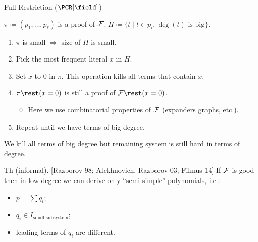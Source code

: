 \begin{frame}{Full Restriction ($\PCR[\field]$)}
    
    $\pi \coloneqq (p_1, \dots, p_{\ell})$ is a proof of $\mathcal{F}$. $H \coloneqq \{t \mid t \in p_i, \deg(t)
    \text{ is big}\}$.

    \begin{enumerate}
        \item $\pi$ is small $\Rightarrow$ size of $H$ is small.
        \pause
        \item Pick the most frequent literal $x$ in $H$.
        \pause
        \item Set $x$ to $0$ in $\pi$. This operation kills all terms that contain $x$.
        \pause
        \item $\pi \rest (x = 0)$ is still a proof of $\Fs \rest (x = 0)$.
        \pause
        \pause
        \pause
            \begin{itemize}
                \item Here we use combinatorial properties of $\mathcal{F}$ (expanders graphs, etc.).
            \end{itemize}
        \pause    
        \item Repeat until we have terms of big degree.
    \end{enumerate}

    \vspace{0.3cm}
    \pause
    We kill all terms of big degree but remaining system is still hard in terms of degree.

    \vspace{0.3cm}
    \pause
    \begin{block}{Th (informal). [Razborov 98; Alekhnovich, Razborov 03; Filmus 14]}
        If $\mathcal{F}$ is \alert{good} then in low degree we can derive only ``semi-simple'' polynomials, i.e.:
        \begin{itemize}
            \item $p = \sum q_i$;
            \item $q_i \in I_{\text{small subsystem}}$;
            \item leading terms of $q_i$ are different.
        \end{itemize}
    \end{block}
\end{frame}


